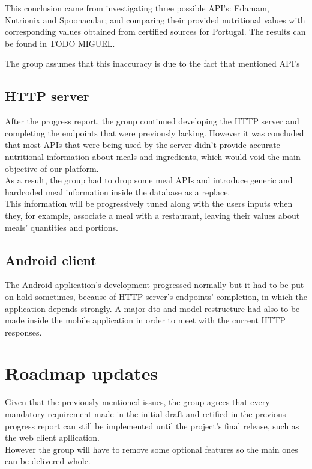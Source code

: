     This conclusion came from investigating three possible API's: Edamam, Nutrionix and Spoonacular; and comparing
    their provided nutritional values with corresponding values obtained from
    certified sources for Portugal. The results can be found in TODO MIGUEL.

    The group assumes that this inaccuracy is due to the fact that
    mentioned API's 
    \subsection{HTTP server}

    After the progress report, the group continued developing the HTTP server and completing the endpoints that were previously lacking. However
    it was concluded that most APIs that were being used by the server didn't provide accurate nutritional information about meals and ingredients,
    which would void the main objective of our platform.\\

    As a result, the group had to drop some meal APIs and introduce generic and hardcoded meal information inside the database as a replace.\\

    This information will be progressively tuned along with the users inputs when they, for example, associate a meal with a restaurant, leaving
    their values about meals' quantities and portions.

    \subsection{Android client}

    The Android application's development progressed normally but it had to be put on hold sometimes, because of HTTP server's endpoints' completion, in which the application
    depends strongly. A major dto and model restructure had also to be made inside the mobile application in order to meet with the current HTTP responses.\\

    \section{Roadmap updates}

    Given that the previously mentioned issues, the group agrees that every mandatory requirement made in the initial draft
    and retified in the previous progress report can still be implemented until the project's final release, such as the web client apllication.\\
    
    However the group will have to remove some optional features so the main ones can be delivered whole.